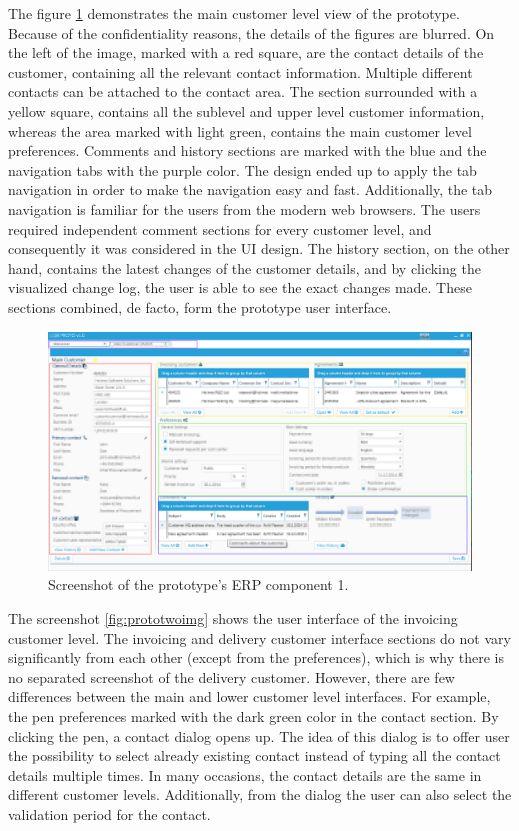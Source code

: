 \documentclass[12pt,a4paper,oneside,pdftex]{report}
\begin{document}
The figure \ref{fig:protooneimg} demonstrates the main customer level view of the prototype. Because of the confidentiality reasons, the details of the figures are blurred. On the left of the image, marked with a red square, are the contact details of the customer, containing all the relevant contact information. Multiple different contacts can be attached to the contact area. The section surrounded with a yellow square, contains all the sublevel and upper level customer information, whereas the area marked with light green, contains the main customer level preferences. Comments and history sections are marked with the blue and the navigation tabs with the purple color. The design ended up to apply the tab navigation in order to make the navigation easy and fast. Additionally, the tab navigation is familiar for the users from the modern web browsers. The users required independent comment sections for every customer level, and consequently it was considered in the UI design. The history section, on the other hand, contains the latest changes of the customer details, and by clicking the visualized change log, the user is able to see the exact changes made. These sections combined, de facto, form the prototype user interface.

\begin{figure}[H]

  	\centerline{
    	   \includegraphics[width=1.3\textwidth]{./images/proto_main.png}
    	   }
  	   \caption{Screenshot of the prototype's ERP component 1.}
	   \label{fig:protooneimg}
\end{figure}

The screenshot \ref{fig:prototwoimg} shows the user interface of the invoicing customer level. The invoicing and delivery customer interface sections do not vary significantly from each other (except from the preferences), which is why there is no separated screenshot of the delivery customer. However, there are few differences between the main and lower customer level interfaces. For example, the pen preferences marked with the dark green color in the contact section. By clicking the pen, a contact dialog opens up. The idea of this dialog is to offer user the possibility to select already existing contact instead of typing all the contact details multiple times. In many occasions, the contact details are the same in different customer levels. Additionally, from the dialog the user can also select the validation period for the contact. 
\end{document}
